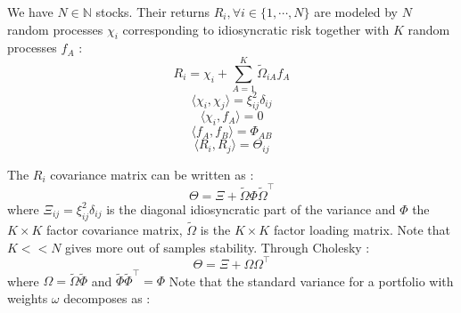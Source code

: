 \documentclass[a4, 14pts]{seminar}
\begin{document}
	    {\small{
\begin{slide}
\slidecontents
\renewcommand\theslideheading{Plan}
\end{slide}

{\small{
\begin{slide}
We have $N\in\mathbb{N}$ stocks. Their returns $R_i, \forall i \in \{1,\cdots,N\}$ are modeled by $N$ random processes  $\chi_i$
corresponding to idiosyncratic risk together with $K$ random processes $f_A$ :
\begin{equation}
R_i = \chi_i + \sum_{A=1}^{K}\widetilde{\Omega}_{iA}f_A
\end{equation}
\begin{equation}
\langle \chi_i, \chi_j \rangle = \xi_{ij}^2 \delta_{ij}
\end{equation}
\begin{equation}
\langle \chi_i, f_A \rangle = 0
\end{equation}
\begin{equation}
\langle f_A,f_B \rangle = \Phi_{AB}
\end{equation}
\begin{equation}
\langle R_i,R_j \rangle = \Theta_{ij}
\end{equation}
\end{slide}
\begin{slide}
The $R_i$ covariance matrix can be written as :
\begin{equation}
\Theta = \Xi + \widetilde{\Omega}\Phi\widetilde{\Omega}^{\intercal}
\end{equation}
where $\Xi_{ij}=\xi_{ij}^2 \delta_{ij}$ is the diagonal idiosyncratic part of the variance and $\Phi$ the $K\times K$ factor covariance matrix, $\widetilde{\Omega}$ is the $K\times K$ factor
loading matrix.
\newline
Note that $K < < N$ gives more out of samples stability. Through Cholesky :
\begin{equation}
\Theta = \Xi + \Omega\Omega^\intercal
\end{equation}
where $\Omega = \widetilde{\Omega}\widetilde{\Phi}$ and $\widetilde{\Phi}\widetilde{\Phi}^\intercal=\Phi$
\newline
Note that the standard variance for a portfolio with weights $\omega$ decomposes as :
\begin{equation}

\end{equation}
\end{slide}}}}}
\end{document}
